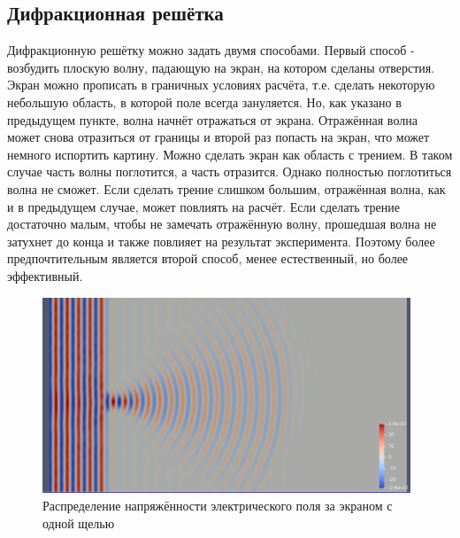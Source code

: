 \documentclass[
11pt,%
tightenlines,%
twoside,%
onecolumn,%
nofloats,%
nobibnotes,%
nofootinbib,%
superscriptaddress,%
noshowpacs,%
centertags]%
{revtex4}
\begin{document}
\subsection{Дифракционная решётка}
Дифракционную решётку можно задать двумя способами. Первый способ - возбудить плоскую волну, падающую
на экран, на котором сделаны отверстия. Экран можно прописать в граничных условиях расчёта, т.е. 
сделать некоторую небольшую область, в которой поле всегда зануляется. Но, как указано в предыдущем 
пункте, волна начнёт отражаться от экрана. Отражённая волна может снова отразиться от границы и второй
раз попасть на экран, что может немного испортить картину. Можно сделать экран как область с трением. 
В таком случае часть волны поглотится, а часть отразится. Однако полностью поглотиться волна не сможет.
Если сделать трение слишком большим, отражённая волна, как и в предыдущем случае, может повлиять на 
расчёт. Если сделать трение достаточно малым, чтобы не замечать отражённую волну, прошедшая волна 
не затухнет до конца и также повлияет на результат эксперимента. Поэтому более предпочтительным 
является второй способ, менее естественный, но более эффективный. \newline
\begin{figure}[h]
    \centering
    \includegraphics[width=11cm]{Field_with_one_gap.png}
    \caption{Распределение напряжённости электрического поля за экраном с одной щелью}
    \label{fig:1}
\end{figure}
\end{document}
